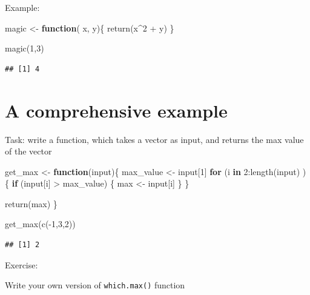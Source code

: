 \documentclass[
  11pt,
]{book}
\newenvironment{Shaded}{\begin{snugshade}}{\end{snugshade}}
\newcommand{\ControlFlowTok}[1]{\textcolor[rgb]{0.13,0.29,0.53}{\textbf{#1}}}
\newcommand{\DecValTok}[1]{\textcolor[rgb]{0.00,0.00,0.81}{#1}}
\newcommand{\FunctionTok}[1]{\textcolor[rgb]{0.00,0.00,0.00}{#1}}
\newcommand{\NormalTok}[1]{#1}
\newcommand{\OtherTok}[1]{\textcolor[rgb]{0.56,0.35,0.01}{#1}}
\newcommand{\SpecialCharTok}[1]{\textcolor[rgb]{0.00,0.00,0.00}{#1}}
\begin{document}
Example:

\begin{Shaded}
\begin{Highlighting}[]
\NormalTok{magic }\OtherTok{\textless{}{-}} \ControlFlowTok{function}\NormalTok{( x, y)\{}
  \FunctionTok{return}\NormalTok{(x}\SpecialCharTok{\^{}}\DecValTok{2} \SpecialCharTok{+}\NormalTok{ y)}
\NormalTok{\}}

\FunctionTok{magic}\NormalTok{(}\DecValTok{1}\NormalTok{,}\DecValTok{3}\NormalTok{)}
\end{Highlighting}
\end{Shaded}

\begin{verbatim}
## [1] 4
\end{verbatim}

\hypertarget{a-comprehensive-example}{%
\section{A comprehensive example}\label{a-comprehensive-example}}

Task: write a function, which takes a vector as input, and returns the max value of the vector

\begin{Shaded}
\begin{Highlighting}[]
\NormalTok{get\_max }\OtherTok{\textless{}{-}} \ControlFlowTok{function}\NormalTok{(input)\{}
\NormalTok{  max\_value }\OtherTok{\textless{}{-}}\NormalTok{ input[}\DecValTok{1}\NormalTok{]}
  \ControlFlowTok{for}\NormalTok{ (i }\ControlFlowTok{in} \DecValTok{2}\SpecialCharTok{:}\FunctionTok{length}\NormalTok{(input) ) \{}
    \ControlFlowTok{if}\NormalTok{ (input[i] }\SpecialCharTok{\textgreater{}}\NormalTok{ max\_value) \{}
\NormalTok{      max }\OtherTok{\textless{}{-}}\NormalTok{ input[i]}
\NormalTok{    \}}
\NormalTok{  \}}
  
  \FunctionTok{return}\NormalTok{(max)}
\NormalTok{\}}

\FunctionTok{get\_max}\NormalTok{(}\FunctionTok{c}\NormalTok{(}\SpecialCharTok{{-}}\DecValTok{1}\NormalTok{,}\DecValTok{3}\NormalTok{,}\DecValTok{2}\NormalTok{))}
\end{Highlighting}
\end{Shaded}

\begin{verbatim}
## [1] 2
\end{verbatim}

Exercise:

Write your own version of \texttt{which.max()} function
\end{document}
